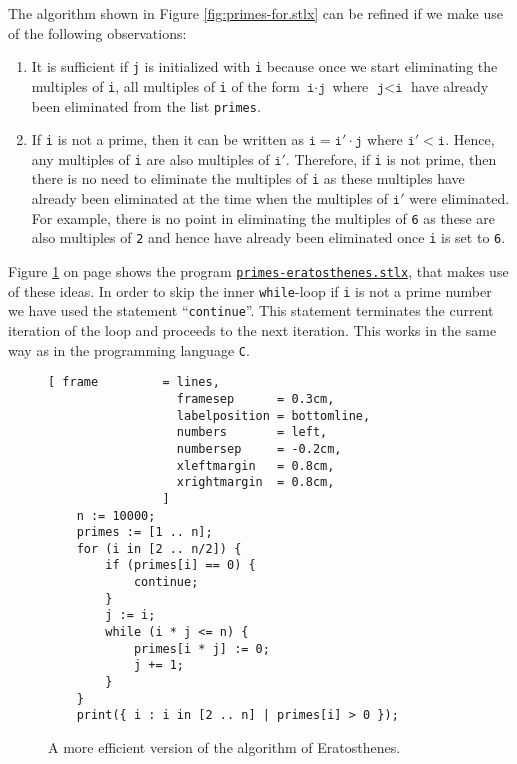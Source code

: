 The algorithm shown in Figure \ref{fig:primes-for.stlx} can be refined if we make use of the following observations:
\begin{enumerate}
\item It is sufficient if \texttt{j} is initialized with \texttt{i} because once we start eliminating the
      multiples of \texttt{i}, all multiples of \texttt{i} of the form $\texttt{i}\cdot\texttt{j}$ where
      $\texttt{j} < \texttt{i}$ have already been eliminated from the list \texttt{primes}. 
\item If \texttt{i} is not a prime, then it can be written as $\texttt{i} = \texttt{i}' \cdot\texttt{j}$ where
      $\texttt{i}' < \texttt{i}$.  Hence, any multiples of \texttt{i} are also multiples of $\texttt{i}'$.
      Therefore, if \texttt{i} is not prime, then there is no need to eliminate the multiples of
      \texttt{i} as these multiples have already been eliminated at the time when the multiples of
      $\texttt{i}'$ were eliminated.  For example, there is no point in eliminating the multiples of
      \texttt{6} as these are also multiples of \texttt{2} and hence have already been eliminated
      once \texttt{i} is set to \texttt{6}.
\end{enumerate}
Figure \ref{fig:primes-eratosthenes.stlx} on page \pageref{fig:primes-eratosthenes.stlx} shows the program
\href{https://github.com/karlstroetmann/Logik/blob/master/SetlX/primes-eratosthenes.stlx}{\texttt{primes-eratosthenes.stlx}}, 
that makes use of these ideas.  In order to skip the inner \texttt{while}-loop if \texttt{i} is not
a prime number we have used the statement ``\texttt{continue}''.  This statement terminates the
current iteration of the loop and proceeds to the next iteration.  This works in the same way as in
the programming language \texttt{C}. 


\begin{figure}[!ht]
  \centering
\begin{Verbatim}[ frame         = lines, 
                  framesep      = 0.3cm, 
                  labelposition = bottomline,
                  numbers       = left,
                  numbersep     = -0.2cm,
                  xleftmargin   = 0.8cm,
                  xrightmargin  = 0.8cm,
                ]
    n := 10000;
    primes := [1 .. n];
    for (i in [2 .. n/2]) {
        if (primes[i] == 0) {
            continue;
        }
        j := i;
        while (i * j <= n) {
            primes[i * j] := 0;
            j += 1;
        }
    }
    print({ i : i in [2 .. n] | primes[i] > 0 });
\end{Verbatim} 
\vspace*{-0.3cm}
\caption{A more efficient version of the algorithm of Eratosthenes.}  \label{fig:primes-eratosthenes.stlx}
\end{figure}


